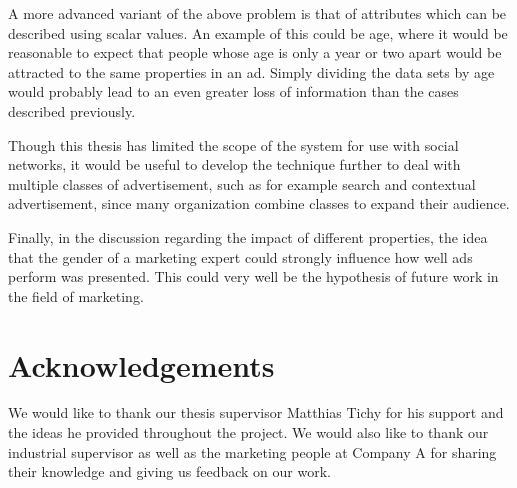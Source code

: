 \documentclass{sig-alternate}
\begin{document}
A more advanced variant of the above problem is that of attributes which can be described using scalar values. An example of this could be age, where it would be reasonable to expect that people whose age is only a year or two apart would be attracted to the same properties in an ad. Simply dividing the data sets by age would probably lead to an even greater loss of information than the cases described previously.

Though this thesis has limited the scope of the system for use with social networks, it would be useful to develop the technique further to deal with multiple classes of advertisement, such as for example search and contextual advertisement, since many organization combine classes to expand their audience.

Finally, in the discussion regarding the impact of different properties, the idea that the gender of a marketing expert could strongly influence how well ads perform was presented. This could very well be the hypothesis of future work in the field of marketing.

\section{Acknowledgements}
We would like to thank our thesis supervisor Matthias Tichy for his support and the ideas he provided throughout the project. We would also like to thank our industrial supervisor as well as the marketing people at Company A for sharing their knowledge and giving us feedback on our work.



\end{document}
